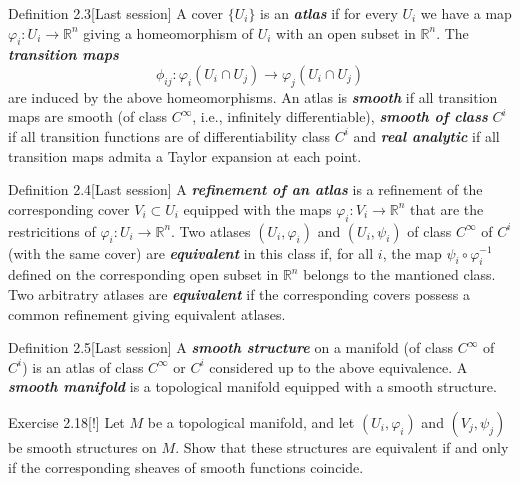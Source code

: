 \begin{thing3}{Definition 2.3}[Last session]\leavevmode
	A cover $\{U_i\}$ is an \textit{\textbf{atlas}} if for every $U_i$ we have a map $\varphi_i:U_i\to \mathbb{R}^n$ giving a homeomorphism of $U_i$ with an open subset in  $\mathbb{R}^n$. The \textit{\textbf{transition maps}} 
	\[\phi_{ij}:\varphi_i(U_i\cap U_j)\to \varphi_j(U_i \cap U_j)\]
	are induced by the above homeomorphisms. An atlas is \textit{\textbf{smooth}} if all transition maps are smooth (of class $C^\infty$, i.e., infinitely differentiable), \textit{\textbf{smooth of class}} $C^i$ if all transition functions are of differentiability class $C^i$ and \textit{\textbf{real analytic}} if all transition maps admita a Taylor expansion at each point.
\end{thing3}

\begin{thing3}{Definition 2.4}[Last session]\leavevmode
A \textit{\textbf{refinement of an atlas}} is a refinement of the corresponding cover $V_i \subset U_i$ equipped with the maps $\varphi_i:V_i\to \mathbb{R}^n$ that are the restricitions of $\varphi_i:U_i \to \mathbb{R}^n$. Two atlases $(U_i,\varphi_i)$ and $(U_i, \psi_i)$ of class $C^\infty$ of $C^i$ (with the same cover) are \textit{\textbf{equivalent}} in this class if, for all $i$, the map $\psi_i \circ \varphi_i^{-1}$ defined on the corresponding open subset in $\mathbb{R}^n$ belongs to the mantioned class. Two arbitratry atlases are \textit{\textbf{equivalent}} if the corresponding covers possess a common refinement giving equivalent atlases.
\end{thing3}

\begin{thing3}{Definition 2.5}[Last session]\leavevmode
	A \textit{\textbf{smooth structure}} on a manifold (of class $C^\infty$ of $C^i$) is an atlas of class $C^\infty$ or $C^i$ considered up to the above equivalence. A \textit{\textbf{smooth manifold}} is a topological manifold equipped with a smooth structure.
\end{thing3}

\begin{thing4}{Exercise 2.18}[!]\label{exer:2.18}\leavevmode
Let $M$ be a topological manifold, and let $(U_i,\varphi_i)$ and $(V_j,\psi_j)$ be smooth structures on $M$. Show that these structures are equivalent if and only if the corresponding sheaves of smooth functions coincide.
\end{thing4}

